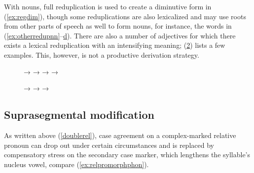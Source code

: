 With nouns, full reduplication is used to create a diminutive
form in (\ref{ex:regdim}), though some reduplications are also lexicalized and
may use roots from other parts of speech as well to form nouns, for instance,
the words in (\ref{ex:otherredupnn}--\hyperref[ex:otherredupvb]{d}). There are
also a number of adjectives for which there exists a lexical reduplication with
an intensifying meaning; (\ref{ex:adjredup}) lists a few examples. This,
however, is not a productive derivation strategy.

\begin{figure}
\pex
	\a {}
		→ \label{ex:regdim}
	\a {}
		→ %
			\label{ex:otherredupnn}
	\a {}
		→  
			\label{ex:otherredupadj}
	\a {} → 
			\label{ex:otherredupvb}
\xe
\end{figure}

\begin{figure}
\pex\label{ex:adjredup}
	\a {}
		→ 
	\a {}
		→ 
	\a {}
		→ 
\xe
\end{figure}


\subsection{Suprasegmental modification}

As written above (\autoref{doublerel}), case agreement on a complex-marked
relative pronoun can drop out under certain
circumstances and is replaced by compensatory stress on the secondary case
marker, which lengthens the syllable's nucleus vowel, compare
(\ref{ex:relpromorphphon}).

